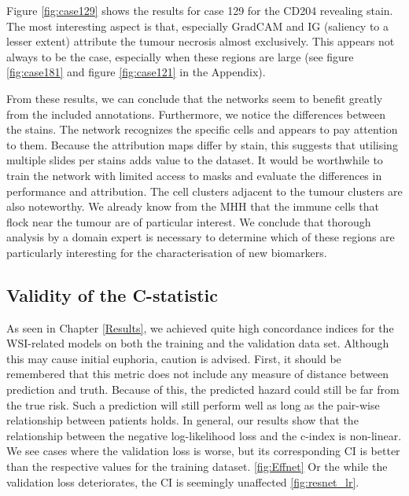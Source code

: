 Figure \ref{fig:case129} shows the results for case 129 for the CD204 revealing stain. The most interesting aspect is that, especially GradCAM and IG (saliency to a lesser extent) attribute the tumour necrosis almost exclusively. This appears not always to be the case, especially when these regions are large (see figure \ref{fig:case181} and figure \ref{fig:case121} in the Appendix).

From these results, we can conclude that the networks seem to benefit greatly from the included annotations. Furthermore, we notice the differences between the stains. The network recognizes the specific cells and appears to pay attention to them. Because the attribution maps differ by stain, this suggests that utilising multiple slides per stains  adds value to the dataset. It would be worthwhile to train the network with limited access to masks and evaluate the differences in performance and attribution.
The cell clusters adjacent to the tumour clusters are also noteworthy. We already know from the MHH that the immune cells that flock near the tumour are of particular interest. We conclude that thorough analysis by a domain expert is necessary to determine which of these regions are particularly interesting for the characterisation of new biomarkers.

\subsection{Validity of the C-statistic}

As seen in Chapter \ref{Results}, we achieved quite high concordance indices for the WSI-related models on both the training and the validation data set. Although this may cause initial euphoria, caution is advised.
First, it should be remembered that this metric does not include any measure of distance between prediction and truth. Because of this, the predicted hazard could still be far from the true risk. Such a prediction will still perform well as long as the pair-wise relationship between patients holds. 
In general, our results show that the relationship between the negative log-likelihood loss and the c-index is non-linear. We see cases where the validation loss is worse, but its corresponding CI is better than the respective values for the training dataset. \ref{fig:Effnet} Or the while the validation loss deteriorates, the CI is seemingly unaffected \ref{fig:resnet_lr}. 


